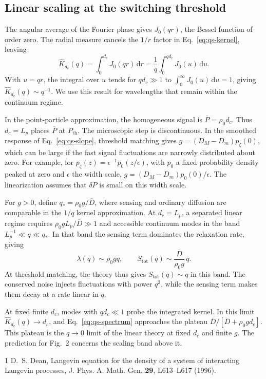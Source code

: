 \documentclass[aps,prl,reprint,letterpaper]{revtex4-2}
\begin{document}
\subsection*{Linear scaling at the switching threshold}

The angular average of the Fourier phase gives \(J_0(qr)\), the Bessel function of order zero. The radial measure cancels the \(1/r\) factor in Eq.~\eqref{eq:qs-kernel}, leaving
\begin{equation}
 \widehat K_{d_c}(q)=\int_0^{d_c}J_0(qr)\,\mathrm{d}r
   =\frac{1}{q}\int_0^{qd_c}J_0(u)\,\mathrm{d}u .
 \label{eq:qs-bessel}
\end{equation}
With \(u=qr\), the integral over \(u\) tends for \(qd_c\gg1\) to \(\int_0^\infty J_0(u)\,\mathrm{d}u=1\), giving \(\widehat K_{d_c}(q)\sim q^{-1}\). We use this result for wavelengths that remain within the continuum regime.

In the point-particle approximation, the homogeneous signal is \(\overline P=\rho_0 d_c\). Thus \(d_c=L_p\) places \(\overline P\) at \(P_{\mathrm{th}}\). The microscopic step is discontinuous. In the smoothed response of Eq.~\eqref{eq:qs-slope}, threshold matching gives \(g=(D_M-D_m)p_\zeta(0)\), which can be large if the fast signal fluctuations are narrowly distributed about zero. For example, for \(p_\zeta(z)=\epsilon^{-1}p_0(z/\epsilon)\), with \(p_0\) a fixed probability density peaked at zero and \(\epsilon\) the width scale, \(g=(D_M-D_m)p_0(0)/\epsilon\). The linearization assumes that \(\delta P\) is small on this width scale.

For \(g>0\), define \(q_*=\rho_0g/\overline D\), where sensing and ordinary diffusion are comparable in the \(1/q\) kernel approximation. At \(d_c=L_p\), a separated linear regime requires \(\rho_0 g L_p/\overline D\gg1\) and accessible continuum modes in the band \(L_p^{-1}\ll q\ll q_*\). In that band the sensing term dominates the relaxation rate, giving
\begin{equation}
 \lambda(q)\sim \rho_0gq,\qquad
 S_{\mathrm{tot}}(q)\sim \frac{\overline D}{\rho_0g}\,q .
 \label{eq:qs-scaling}
\end{equation}
At threshold matching, the theory thus gives \(S_{\mathrm{tot}}(q)\sim q\) in this band. The conserved noise injects fluctuations with power \(q^2\), while the sensing term makes them decay at a rate linear in \(q\).

At fixed finite \(d_c\), modes with \(qd_c\ll1\) probe the integrated kernel. In this limit \(\widehat K_{d_c}(q)\to d_c\), and Eq.~\eqref{eq:qs-spectrum} approaches the plateau \(\overline D/[\overline D+\rho_0g d_c]\). This plateau is the \(q\to0\) limit of the linear theory at fixed \(d_c\) and finite \(g\). The prediction for Fig.~2 concerns the scaling band above it.

\begin{thebibliography}{1}
D.~S. Dean, Langevin equation for the density of a system of interacting Langevin processes, J. Phys. A: Math. Gen. \textbf{29}, L613--L617 (1996).
\end{thebibliography}
\end{document}
